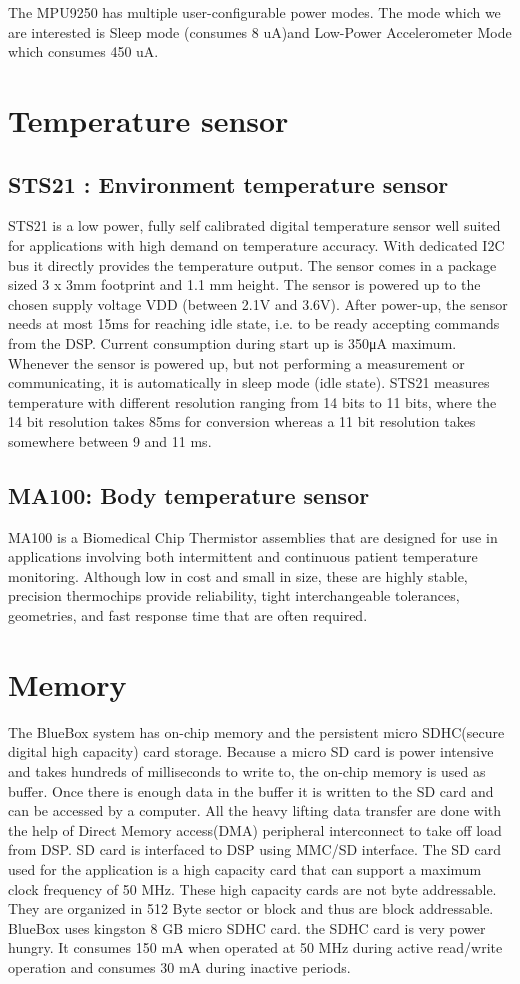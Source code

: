 The MPU9250 has multiple user-configurable power modes. The mode which we are interested is Sleep mode (consumes 8 uA)and Low-Power Accelerometer Mode which consumes 450 uA. 
 
\section{Temperature sensor}
\subsection{ STS21 : Environment temperature sensor}
STS21 is a low power, fully self calibrated digital temperature sensor well suited for applications with high demand on temperature accuracy. With dedicated I2C bus it directly provides the temperature output. The sensor comes in a package sized 3 x 3mm footprint and 1.1 mm height. The sensor is powered up to the chosen supply voltage VDD (between 2.1V and 3.6V). After power-up, the sensor needs at most 15ms for reaching idle state, i.e. to be ready accepting commands from the DSP. Current consumption during start up is 350μA maximum. Whenever the sensor is powered up, but not performing a measurement or communicating, it is automatically in sleep mode (idle state). STS21 measures temperature with different resolution ranging from 14 bits to 11 bits, where the 14 bit resolution takes 85ms for conversion whereas a 11 bit resolution takes somewhere between 9 and 11 ms.  

\subsection{MA100: Body temperature sensor} 
MA100 is a Biomedical Chip Thermistor assemblies that are designed for use in applications involving both intermittent and continuous patient temperature monitoring. Although low in cost and small in size, these are highly stable, precision thermochips provide reliability, tight interchangeable tolerances, geometries, and fast response time that are often required.
 
\section{Memory}\label{memory}
The BlueBox system has on-chip memory and the persistent micro SDHC(secure digital high capacity) card storage. Because a micro SD card is power intensive and takes hundreds of milliseconds to write to, the on-chip memory is used as buffer. Once there is enough data in the buffer it is written to the SD card and can be accessed by a computer. All the heavy lifting data transfer are done with the help of Direct Memory access(DMA) peripheral interconnect to take off load from DSP. SD card is interfaced to DSP using MMC/SD interface. The SD card used for the application is a high capacity card that can support a maximum clock frequency of 50 MHz. These high capacity cards are not byte addressable. They are organized in 512 Byte sector or block and thus are block addressable. BlueBox uses kingston 8 GB micro SDHC card. the SDHC card is very power hungry. It consumes 150 mA  when operated at 50 MHz  during active read/write operation and consumes 30 mA during inactive periods.

